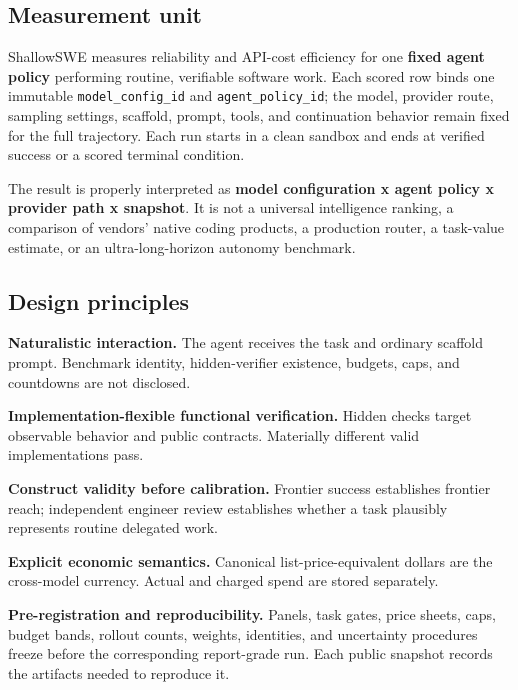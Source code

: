 \documentclass[11pt]{article}
\begin{document}
\subsection{Measurement unit}\hypertarget{21-measurement-unit}{}\label{21-measurement-unit}

ShallowSWE measures reliability and API-cost efficiency for one \textbf{fixed agent policy} performing routine, verifiable software work. Each scored row binds one immutable \texttt{model\_config\_id} and \texttt{agent\_policy\_id}; the model, provider route, sampling settings, scaffold, prompt, tools, and continuation behavior remain fixed for the full trajectory. Each run starts in a clean sandbox and ends at verified success or a scored terminal condition.

The result is properly interpreted as \textbf{model configuration x agent policy x provider path x snapshot}. It is not a universal intelligence ranking, a comparison of vendors' native coding products, a production router, a task-value estimate, or an ultra-long-horizon autonomy benchmark.

\subsection{Design principles}\hypertarget{22-design-principles}{}\label{22-design-principles}

\textbf{Naturalistic interaction.} The agent receives the task and ordinary scaffold prompt. Benchmark identity, hidden-verifier existence, budgets, caps, and countdowns are not disclosed.

\textbf{Implementation-flexible functional verification.} Hidden checks target observable behavior and public contracts. Materially different valid implementations pass.

\textbf{Construct validity before calibration.} Frontier success establishes frontier reach; independent engineer review establishes whether a task plausibly represents routine delegated work.

\textbf{Explicit economic semantics.} Canonical list-price-equivalent dollars are the cross-model currency. Actual and charged spend are stored separately.

\textbf{Pre-registration and reproducibility.} Panels, task gates, price sheets, caps, budget bands, rollout counts, weights, identities, and uncertainty procedures freeze before the corresponding report-grade run. Each public snapshot records the artifacts needed to reproduce it.
\end{document}
